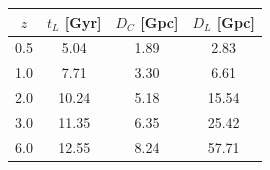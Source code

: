 \begin{tabular}{cccc}
\toprule
$z$ & $t_L$ [Gyr] & $D_C$ [Gpc] & $D_L$ [Gpc] \\
\midrule
0.5 & 5.04 & 1.89 & 2.83 \\
1.0 & 7.71 & 3.30 & 6.61 \\
2.0 & 10.24 & 5.18 & 15.54 \\
3.0 & 11.35 & 6.35 & 25.42 \\
6.0 & 12.55 & 8.24 & 57.71 \\
\bottomrule
\end{tabular}